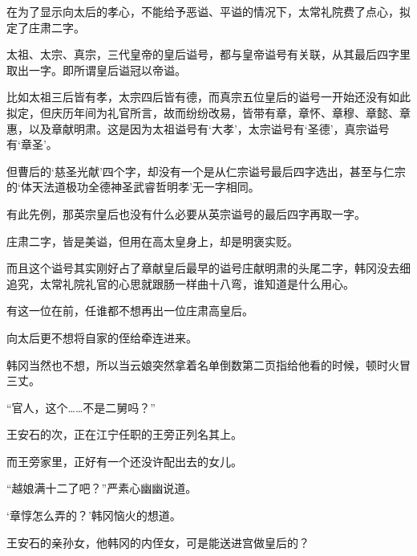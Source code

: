 在为了显示向太后的孝心，不能给予恶谥、平谥的情况下，太常礼院费了点心，拟定了庄肃二字。

太祖、太宗、真宗，三代皇帝的皇后谥号，都与皇帝谥号有关联，从其最后四字里取出一字。即所谓皇后谥冠以帝谥。

比如太祖三后皆有孝，太宗四后皆有德，而真宗五位皇后的谥号一开始还没有如此拟定，但庆历年间为礼官所言，故而纷纷改易，皆带有章，章怀、章穆、章懿、章惠，以及章献明肃。这是因为太祖谥号有‘大孝’，太宗谥号有‘圣德’，真宗谥号有‘章圣’。

但曹后的‘慈圣光献’四个字，却没有一个是从仁宗谥号最后四字选出，甚至与仁宗的‘体天法道极功全德神圣武睿哲明孝’无一字相同。

有此先例，那英宗皇后也没有什么必要从英宗谥号的最后四字再取一字。

庄肃二字，皆是美谥，但用在高太皇身上，却是明褒实贬。

而且这个谥号其实刚好占了章献皇后最早的谥号庄献明肃的头尾二字，韩冈没去细追究，太常礼院礼官的心思就跟肠一样曲十八弯，谁知道是什么用心。

有这一位在前，任谁都不想再出一位庄肃高皇后。

向太后更不想将自家的侄给牵连进来。

韩冈当然也不想，所以当云娘突然拿着名单倒数第二页指给他看的时候，顿时火冒三丈。

“官人，这个……不是二舅吗？”

王安石的次，正在江宁任职的王旁正列名其上。

而王旁家里，正好有一个还没许配出去的女儿。

“越娘满十二了吧？”严素心幽幽说道。

‘章惇怎么弄的？’韩冈恼火的想道。

王安石的亲孙女，他韩冈的内侄女，可是能送进宫做皇后的？

